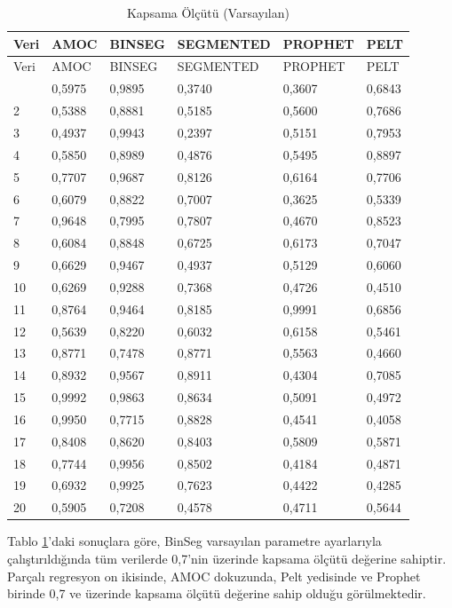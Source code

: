 \documentclass[12pt,twoside]{deuthesis}
\begin{document}
\begin{longtable}[]{@{}llllll@{}}
\caption{\label{tab:nvar9} Kapsama Ölçütü (Varsayılan)}\tabularnewline
\toprule\noalign{}
Veri & AMOC & BINSEG & SEGMENTED & PROPHET & PELT \\
\midrule\noalign{}
\endfirsthead
\toprule\noalign{}
Veri & AMOC & BINSEG & SEGMENTED & PROPHET & PELT \\
\midrule\noalign{}
\endhead
\bottomrule\noalign{}
\endlastfoot
1 & 0,5975 & 0,9895 & 0,3740 & 0,3607 & 0,6843 \\
2 & 0,5388 & 0,8881 & 0,5185 & 0,5600 & 0,7686 \\
3 & 0,4937 & 0,9943 & 0,2397 & 0,5151 & 0,7953 \\
4 & 0,5850 & 0,8989 & 0,4876 & 0,5495 & 0,8897 \\
5 & 0,7707 & 0,9687 & 0,8126 & 0,6164 & 0,7706 \\
6 & 0,6079 & 0,8822 & 0,7007 & 0,3625 & 0,5339 \\
7 & 0,9648 & 0,7995 & 0,7807 & 0,4670 & 0,8523 \\
8 & 0,6084 & 0,8848 & 0,6725 & 0,6173 & 0,7047 \\
9 & 0,6629 & 0,9467 & 0,4937 & 0,5129 & 0,6060 \\
10 & 0,6269 & 0,9288 & 0,7368 & 0,4726 & 0,4510 \\
11 & 0,8764 & 0,9464 & 0,8185 & 0,9991 & 0,6856 \\
12 & 0,5639 & 0,8220 & 0,6032 & 0,6158 & 0,5461 \\
13 & 0,8771 & 0,7478 & 0,8771 & 0,5563 & 0,4660 \\
14 & 0,8932 & 0,9567 & 0,8911 & 0,4304 & 0,7085 \\
15 & 0,9992 & 0,9863 & 0,8634 & 0,5091 & 0,4972 \\
16 & 0,9950 & 0,7715 & 0,8828 & 0,4541 & 0,4058 \\
17 & 0,8408 & 0,8620 & 0,8403 & 0,5809 & 0,5871 \\
18 & 0,7744 & 0,9956 & 0,8502 & 0,4184 & 0,4871 \\
19 & 0,6932 & 0,9925 & 0,7623 & 0,4422 & 0,4285 \\
20 & 0,5905 & 0,7208 & 0,4578 & 0,4711 & 0,5644 \\
\end{longtable}

Tablo \ref{tab:nvar9}'daki sonuçlara göre, BinSeg varsayılan parametre ayarlarıyla çalıştırıldığında tüm verilerde 0,7'nin üzerinde kapsama ölçütü değerine sahiptir. Parçalı regresyon on ikisinde, AMOC dokuzunda, Pelt yedisinde ve Prophet birinde 0,7 ve üzerinde kapsama ölçütü değerine sahip olduğu görülmektedir.
\end{document}
